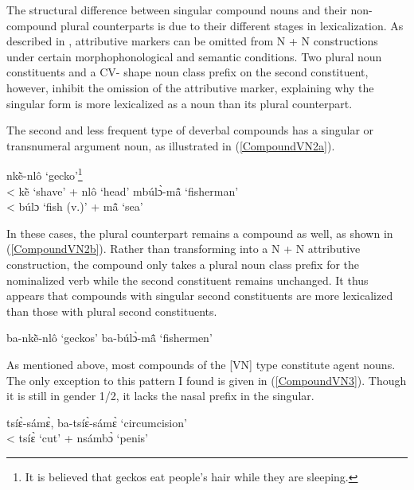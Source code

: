 \noindent The structural difference between singular compound nouns and their non-compound plural counterparts is due to their different stages in lexicalization. As described in , attributive markers can be omitted from N + N constructions under certain morphophonological and semantic conditions. Two plural noun constituents and a CV- shape noun class prefix on the second constituent, however, inhibit the omission of the attributive marker,  explaining why the singular form is more lexicalized as a noun than its plural counterpart.

The second and less frequent type of deverbal compounds has a singular or transnumeral argument noun, as illustrated in (\ref{CompoundVN2a}).

\begin{exe}
\ex\label{CompoundVN2a} 
\begin{xlist}
\ex nkẽ̀-nlô `gecko'\footnote{It is believed that geckos eat people's hair while they are sleeping.} \\ < kẽ̀ `shave' + nlô `head'
\ex mbúlɔ̀-mã̂ `fisherman' \\ < búlɔ `fish (v.)' + mã̂ `sea'
\end{xlist}
\end{exe}

\noindent In these cases, the plural counterpart remains a compound as well, as shown in (\ref{CompoundVN2b}). Rather than transforming into a N + N attributive construction, the compound only takes a plural noun class prefix for the nominalized verb while the second constituent remains unchanged. It thus appears that compounds with singular second constituents are more lexicalized than those with plural second constituents.

\begin{exe}
\ex\label{CompoundVN2b} 
\begin{xlist}
\ex ba-nkẽ̀-nlô `geckos'
\ex ba-búlɔ̀-mã̂ `fishermen'
\end{xlist}
\end{exe}

As mentioned above, most compounds of the [VN] type constitute agent nouns. The only exception to this pattern I found is given in (\ref{CompoundVN3}). Though it is still in gender 1/2, it lacks the nasal prefix in the singular. 

\begin{exe}
\ex\label{CompoundVN3} tsíɛ̀-sámɛ̀, ba-tsíɛ̀-sámɛ̀ `circumcision' \\ < tsíɛ̀ `cut' + nsámbɔ̀ `penis'
\end{exe}

